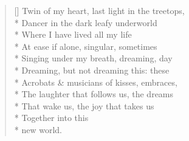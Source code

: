\label{ch:ten_lines}
\settowidth{\versewidth}{Twin of my heart, last light in the treetops,}
\begin{verse}[\versewidth]
Twin of my heart, last light in the treetops,\\*
Dancer in the dark leafy underworld\\*
Where I have lived all my life\\*
At ease if alone, singular, sometimes\\*
Singing under my breath, dreaming, day\\*
Dreaming, but not dreaming this: these\\*
Acrobats \& musicians of kisses, embraces,\\*
The laughter that follows us, the dreams\\*
That wake us, the joy that takes us\\*
Together into this \\*
 new world.
\end{verse}
